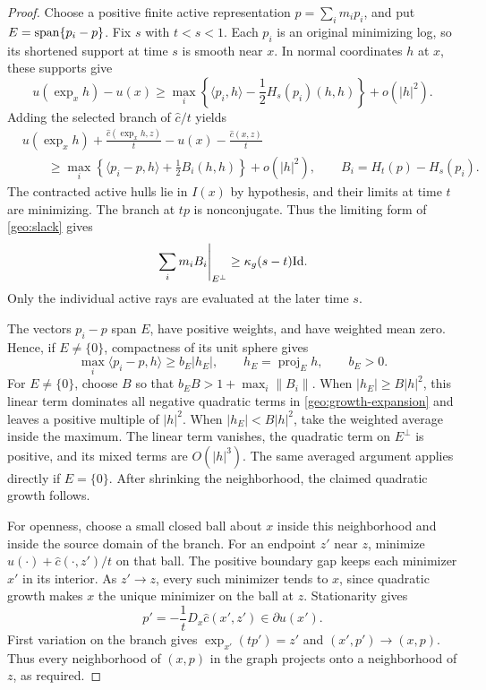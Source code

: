 \begin{proof}
Choose a positive finite active representation
$p=\sum_i m_ip_i$, and put $E=\operatorname{span}\{p_i-p\}$.
Fix $s$ with $t<s<1$.  Each $p_i$ is an original minimizing log,
so its shortened support at time $s$ is smooth near $x$.
In normal coordinates $h$ at $x$, these supports give
\[
 u(\exp_xh)-u(x)
 \geq\max_i\left\{\langle p_i,h\rangle
                 -\frac12H_s(p_i)(h,h)\right\}+o(|h|^2).
\]
Adding the selected branch of $\hat c/t$ yields
\begin{equation}
 \label{geo:growth-expansion}
 \begin{split}
 &u(\exp_xh)+\frac{\hat c(\exp_xh,z)}t
       -u(x)-\frac{\hat c(x,z)}t\\
 &\qquad\geq
 \max_i\left\{\langle p_i-p,h\rangle
                     +\frac12B_i(h,h)\right\}+o(|h|^2),
 \qquad B_i=H_t(p)-H_s(p_i).
 \end{split}
\end{equation}
The contracted active hulls lie in $I(x)$ by hypothesis, and their
limits at time $t$ are minimizing.  The branch at $tp$ is
nonconjugate.  Thus the limiting form of \cref{geo:slack} gives
\[
 \left.\sum_i m_iB_i\right|_{E^\perp}
 \geq\kappa_g(s-t)\mathrm{Id}.
\]
Only the individual active rays are evaluated at the later time $s$.

The vectors $p_i-p$ span $E$, have positive weights, and have weighted
mean zero.  Hence, if $E\ne\{0\}$, compactness of its unit sphere gives
\[
 \max_i\langle p_i-p,h\rangle\geq b_E|h_E|,
 \qquad h_E=\operatorname{proj}_Eh,
 \qquad b_E>0.
\]
For $E\ne\{0\}$, choose $B$ so that
$b_E B>1+\max_i\|B_i\|$.
When $|h_E|\geq B|h|^2$, this linear term dominates all negative
quadratic terms in \eqref{geo:growth-expansion} and leaves a positive
multiple of $|h|^2$.  When $|h_E|<B|h|^2$, take the weighted average
inside the maximum.  The linear term vanishes, the quadratic term on
$E^\perp$ is positive, and its mixed terms are $O(|h|^3)$.
The same averaged argument applies directly if $E=\{0\}$.
After shrinking the neighborhood, the claimed quadratic growth follows.

For openness, choose a small closed ball about $x$ inside this
neighborhood and inside the source domain of the branch.  For an
endpoint $z'$ near $z$, minimize
$u(\cdot)+\hat c(\cdot,z')/t$ on that ball.  The positive boundary
gap keeps each minimizer $x'$ in its interior.  As $z'\to z$, every
such minimizer tends to $x$, since quadratic growth makes $x$ the
unique minimizer on the ball at $z$.  Stationarity gives
\[
 p'=-\frac1tD_x\hat c(x',z')\in\partial u(x').
\]
First variation on the branch gives $\exp_{x'}(tp')=z'$ and
$(x',p')\to(x,p)$.  Thus every neighborhood of $(x,p)$ in the graph
projects onto a neighborhood of $z$, as required.
\end{proof}

